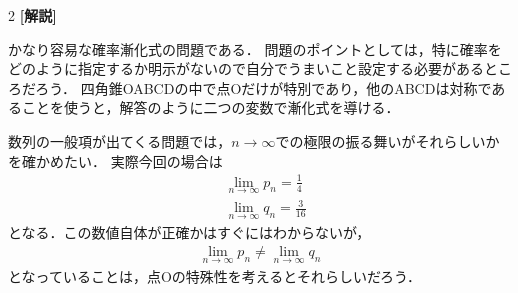 \documentclass[../../main.tex]{subfiles}
\begin{document}
\begin{multicols}{2}
  \vspace{10pt}
  {\bf[解説]}

  かなり容易な確率漸化式の問題である．
  問題のポイントとしては，特に確率をどのように指定するか明示がないので自分でうまいこと設定する必要があるところだろう．
  四角錐OABCDの中で点Oだけが特別であり，他のABCDは対称であることを使うと，解答のように二つの変数で漸化式を導ける．

  数列の一般項が出てくる問題では，$n\to\infty$での極限の振る舞いがそれらしいかを確かめたい．
  実際今回の場合は
  \begin{align*}
     & \lim_{n\to\infty} p_n = \frac{1}{4}  \\
     & \lim_{n\to\infty} q_n = \frac{3}{16}
  \end{align*}
  となる．この数値自体が正確かはすぐにはわからないが，
  \begin{align*}
    \lim_{n\to\infty} p_n \neq \lim_{n\to\infty} q_n
  \end{align*}
  となっていることは，点Oの特殊性を考えるとそれらしいだろう．

  \newpage
\end{multicols}
\end{document}
